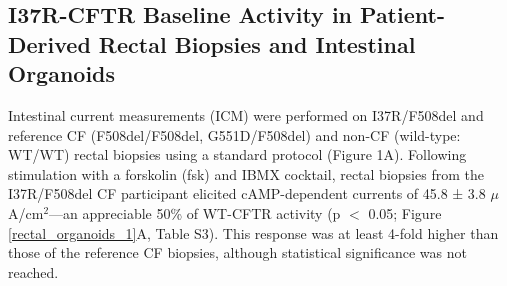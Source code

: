 \subsection{I37R-CFTR Baseline Activity in Patient-Derived Rectal Biopsies and Intestinal Organoids}
Intestinal current measurements (ICM) were performed on I37R/F508del and reference CF (F508del/F508del, G551D/F508del) and non-CF (wild-type: WT/WT) rectal biopsies using a standard protocol \cite{clancy2013, graeber2015} (Figure 1A). Following stimulation with a forskolin (fsk) and IBMX cocktail, rectal biopsies from the I37R/F508del CF participant elicited cAMP-dependent currents of 45.8 ± 3.8 $\mu$A/cm$^2$—an appreciable 50\% of WT-CFTR activity (p $<$ 0.05; Figure \ref{rectal_organoids_1}A, Table S3). This response was at least 4-fold higher than those of the reference CF biopsies, although statistical significance was not reached.

\noindent

